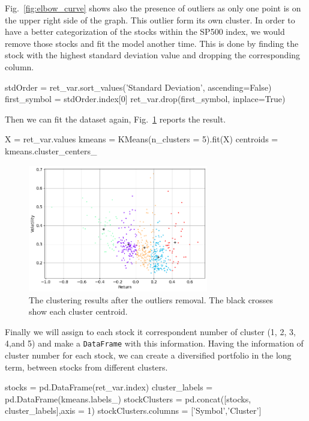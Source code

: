 Fig.~\ref{fig:elbow_curve} shows also the presence of outliers as only one point is on the upper right side of the graph. This outlier form its own cluster. In order to have a better categorization of the stocks within the SP500 index, we would remove those stocks and fit the model another time.
This is done by finding the stock with the highest standard deviation value and dropping the corresponding column.
 
\begin{ipythonnon}
stdOrder = ret_var.sort_values('Standard Deviation', ascending=False)
first_symbol = stdOrder.index[0]
ret_var.drop(first_symbol, inplace=True)
\end{ipythonnon}
Then we can fit the dataset again, Fig.~\ref{fig:k_means_noout} reports the result.

\begin{ipythonnon}
X = ret_var.values
kmeans = KMeans(n_clusters = 5).fit(X)
centroids = kmeans.cluster_centers_
\end{ipythonnon}
 
\begin{figure}
\centering
\includegraphics[width=0.7\textwidth]{figures/k_means_noout}
\caption{The clustering results after the outliers removal. The black crosses show each cluster centroid.}
\label{fig:k_means_noout}
\end{figure}
  
Finally we will assign to each stock it correspondent number of cluster (1, 2, 3, 4,and 5) and make a \texttt{DataFrame} with this information. Having the information of cluster number for each stock, we can create a diversified portfolio in the long term, between stocks from different clusters.

\begin{ipythonnon} 
stocks = pd.DataFrame(ret_var.index)
cluster_labels = pd.DataFrame(kmeans.labels_)
stockClusters = pd.concat([stocks, cluster_labels],axis = 1)
stockClusters.columns = ['Symbol','Cluster']
\end{ipythonnon}
 
